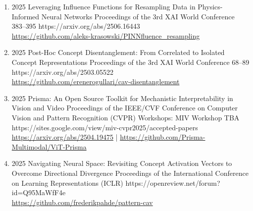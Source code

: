 {\begin{enumerate}
        \item {}
                        {2025}
                        {Leveraging Influence Functions for Resampling Data in Physics-Informed Neural Networks}
                        {Proceedings of the 3rd XAI World Conference}
                        {383--395}
                        {https://arxiv.org/abs/2506.16443}
                        {
                            \\\href{https://github.com/aleks-krasowski/PINNfluence_resampling}{https://github.com/aleks-krasowski/PINNfluence\_resampling}
                        }
        
        \item {}
                        {2025}
                        {Post-Hoc Concept Disentanglement: From Correlated to Isolated Concept Representations}
                        {Proceedings of the 3rd XAI World Conference}
                        {68--89}
                        {https://arxiv.org/abs/2503.05522}
                        {
                            \\\href{https://github.com/erenerogullari/cav-disentanglement}{https://github.com/erenerogullari/cav-disentanglement}
                        }
                        
        \item {}
                        {2025}
                        {Prisma: An Open Source Toolkit for Mechanistic Interpretability in Vision and Video}
                        {Proceedings of the IEEE/CVF Conference on Computer Vision and Pattern Recognition (CVPR) Workshops: MIV Workshop}
                        {TBA}
                        {https://sites.google.com/view/miv-cvpr2025/accepted-papers}
                        {
                            \\\href{https://arxiv.org/abs/2504.19475}{https://arxiv.org/abs/2504.19475} | \href{https://github.com/Prisma-Multimodal/ViT-Prisma}{https://github.com/Prisma-Multimodal/ViT-Prisma}
                        }
        
        \item {}
                        {2025}
                        {Navigating Neural Space: Revisiting Concept Activation Vectors to Overcome Directional Divergence}
                        {Proceedings of the International Conference on Learning Representations (ICLR)}
                        {}
                        {https://openreview.net/forum?id=Q95MaWfF4e}
                        {\\ \href{https://github.com/frederikpahde/pattern-cav}{https://github.com/frederikpahde/pattern-cav}}
        

\end{enumerate}}
